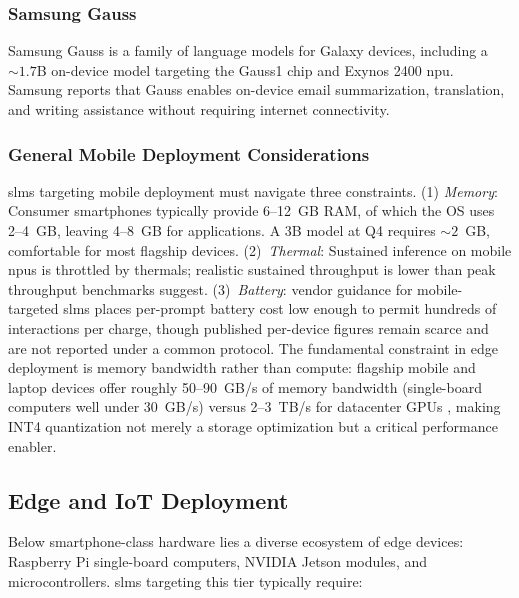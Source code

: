 \subsubsection{Samsung Gauss}

Samsung Gauss \citep{samsung2023gauss} is a family of language models for Galaxy devices, including a ${\sim}1.7$B on-device model targeting the Gauss1 chip and Exynos 2400 \gls{npu}. Samsung reports that Gauss enables on-device email summarization, translation, and writing assistance without requiring internet connectivity.

\subsubsection{General Mobile Deployment Considerations}

\glspl{slm} targeting mobile deployment must navigate three constraints. (1) \emph{Memory}: Consumer smartphones typically provide 6--12~GB RAM, of which the OS uses 2--4~GB, leaving 4--8~GB for applications. A 3B model at Q4 requires ${\sim}2$~GB, comfortable for most flagship devices. (2)~\emph{Thermal}: Sustained inference on mobile \glspl{npu} is throttled by thermals; realistic sustained throughput is lower than peak throughput benchmarks suggest. (3)~\emph{Battery}: vendor guidance for mobile-targeted \glspl{slm} places per-prompt battery cost low enough to permit hundreds of interactions per charge, though published per-device figures remain scarce and are not reported under a common protocol. The fundamental constraint in edge deployment is memory bandwidth rather than compute: flagship mobile and laptop devices offer roughly 50--90~GB/s of memory bandwidth (single-board computers well under 30~GB/s) versus 2--3~TB/s for datacenter GPUs \citep{xu2024device}, making INT4 quantization not merely a storage optimization but a critical performance enabler.

\subsection{Edge and IoT Deployment}
\label{subsec:deployment_edge}

Below smartphone-class hardware lies a diverse ecosystem of edge devices: Raspberry Pi single-board computers, NVIDIA Jetson modules, and microcontrollers. \glspl{slm} targeting this tier typically require:

